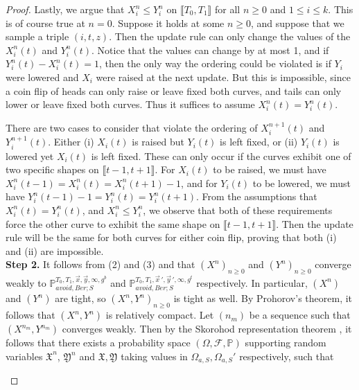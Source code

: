 \begin{proof}
	Lastly, we argue that $X^n_i\leq Y^n_i$ on $\llbracket T_0, T_1 \rrbracket$ for all $n\geq 0$ and $1\leq i\leq k$. This is of course true at $n=0$. Suppose it holds at some $n\geq 0$, and suppose that we sample a triple $(i,t,z)$. Then the update rule can only change the values of the $X_i^n(t)$ and $Y_i^n(t)$. Notice that the values can change by at most 1, and if $Y^n_i(t) - X^n_i(t) = 1$, then the only way the ordering could be violated is if $Y_i$ were lowered and $X_i$ were raised at the next update. But this is impossible, since a coin flip of heads can only raise or leave fixed both curves, and tails can only lower or leave fixed both curves. Thus it suffices to assume $X^n_i(t) = Y^n_i(t)$.
	
	There are two cases to consider that violate the ordering of $X^{n+1}_i(t)$ and $Y^{n+1}_i(t)$. Either (i) $X_i(t)$ is raised but $Y_i(t)$ is left fixed, or (ii) $Y_i(t)$ is lowered yet $X_i(t)$ is left fixed. These can only occur if the curves exhibit one of two specific shapes on $\llbracket t-1, t+1\rrbracket$. For $X_i(t)$ to be raised, we must have $X^n_i(t-1) = X^n_i(t) = X^n_i(t+1) - 1$, and for $Y_i(t)$ to be lowered, we must have $Y^n_i(t-1) - 1 = Y^n_i(t) = Y^n_i(t+1)$. From the assumptions that $X^n_i(t) = Y^n_i(t)$, and $X^n_i \leq Y^n_i$, we observe that both of these requirements force the other curve to exhibit the same shape on $\llbracket t-1, t+1\rrbracket$. Then the update rule will be the same for both curves for either coin flip, proving that both (i) and (ii) are impossible. \\
	
	\noindent\textbf{Step 2.} It follows from (2) and (3) and \cite[Theorem 1.8.3]{Norris} that $(X^n)_{n\geq 0}$ and $(Y^n)_{n\geq 0}$ converge weakly to $\mathbb{P}_{avoid,Ber;S}^{T_0,T_1,\vec{x},\vec{y},\infty,g^b}$ and $\mathbb{P}_{avoid,Ber;S}^{T_0,T_1,\vec{x}\,',\vec{y}\,',\infty,g^t}$ respectively. In particular, $(X^n)$ and $(Y^n)$ are tight, so $(X^n,Y^n)_{n\geq 0}$ is tight as well. By Prohorov's theorem, it follows that $(X^n,Y^n)$ is relatively compact. Let $(n_m)$ be a sequence such that $(X^{n_m},Y^{n_m})$ converges weakly. Then by the Skorohod representation theorem \cite[Theorem 6.7]{Billing}, it follows that there exists a probability space $(\Omega,\mathcal{F},\mathbb{P})$ supporting random variables $\mathfrak{X}^n$, $\mathfrak{Y}^n$ and $\mathfrak{X},\mathfrak{Y}$ taking values in $\Omega_{a,S},\Omega_{a,S}'$ respectively, such that
	\begin{enumerate}[label=(\arabic*)]
		

\end{enumerate}
\end{proof}

